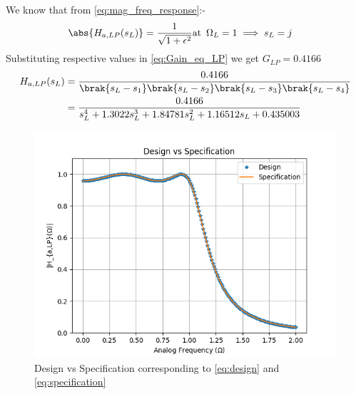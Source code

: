\documentclass{article}
\begin{document}
\begin{enumerate}
          We know that from \eqref{eq:mag_freq_response}:-
          \begin{align}
              \abs{ H_{a,LP}(s_L)} & = \frac{1}{\sqrt{1+\epsilon^2}} \text{at} \hspace{5pt} \Omega_{L}=1 \implies s_{L} = j \label{eq:Gain_eq_LP}
          \end{align}
          Substituting respective values in \eqref{eq:Gain_eq_LP} we get $G_{LP}=0.4166$
          \begin{align}
              H_{a,LP}(s_L) & = \frac{0.4166}{\brak{s_L-s_1}\brak{s_L-s_2}\brak{s_L-s_3}\brak{s_L-s_4}}                          \\
                            & = \frac{0.4166}{s_{L}^4 + 1.3022s_{L}^3 +1.84781s_{L}^2 + 1.16512s_{L} +0.435003}\label{eq:design}
          \end{align}
          \begin{figure}[H]
              \centering
              \includegraphics[width=1\columnwidth]{figs/Design_vs_Specification.png}
              \caption{Design vs Specification corresponding to \eqref{eq:design} and \eqref{eq:specification}}
              \label{fig:design_vs_specf}
          \end{figure}
          

\end{enumerate}
\end{document}
